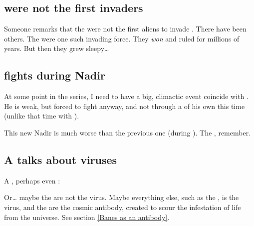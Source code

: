 \subsection{\Banes{} were not the first invaders}
Someone remarks that the \banes{} were not the first aliens to invade \Miith. 
There have been others. 
The \xss{} were one such invading force. 
They \emph{won} and ruled \Miith{} for millions of years. 
But then they grew sleepy\ldots{}







\subsection{\Ishnaruchaefir{} fights during Nadir}
At some point in the series, I need to have a big, climactic event coincide with . 
He is weak, but forced to fight anyway, and not through a \XanatosGambit{} of his own this time (unlike that time with \Teshrial). 

This new Nadir is much worse than the previous one (during \TwilightAngelRememberEmph). 
The , remember.








\subsection{A \bane{} talks about viruses}
A \bane, perhaps even \Daggerrain: 

Or\ldots{} maybe the \banes{} are not the virus. Maybe everything else, such as the \dragons, is the virus, and the \banes{} are the cosmic antibody, created to scour the infestation of life from the universe. See section \ref{Banes as an antibody}. 







\subsection{\Vizsherioch}
